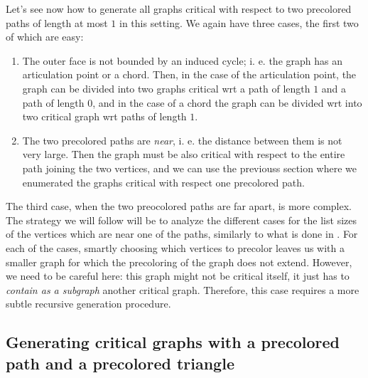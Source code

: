 \documentclass{article}
\begin{document}
Let's see now how to generate all graphs critical with respect to two precolored paths of length at most $1$ in this setting. We again have three cases, the first two of which are easy:

\begin{enumerate}
\item The outer face is not bounded by an induced cycle; i. e. the graph has an articulation point or a chord. Then, in the case of the articulation point, the graph can be divided into two graphs critical wrt a path of length $1$ and a path of length $0$, and in the case of a chord the graph can be divided wrt into two critical graph wrt paths of length $1$. 
\item The two precolored paths are \emph{near}, i. e. the distance between them is not very large. Then the graph must be also critical with respect to the entire path joining the two vertices, and we can use the previouss section where we enumerated the graphs critical with respect one precolored path. 
\end{enumerate}

The third case, when the two preocolored paths are far apart, is more complex. The strategy we will follow will be to analyze the different cases for the list sizes of the vertices which are near one of the paths, similarly to what is done in \cite{crossingsfarapart}. For each of the cases, smartly choosing which vertices to precolor leaves us with a smaller graph for which the precoloring of the graph does not extend. However, we need to be careful here: this graph might not be critical itself, it just has to \emph{contain as a subgraph} another critical graph. Therefore, this case requires a more subtle recursive generation procedure. 

\subsection{Generating critical graphs with a precolored path and a precolored triangle}



\newpage

\printbibliography
\end{document}
